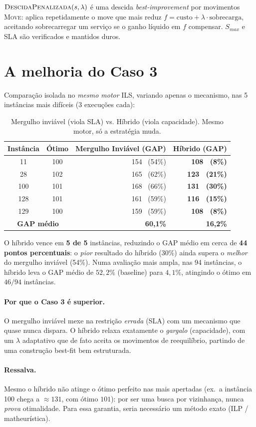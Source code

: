 \documentclass{article}
\begin{document}
\noindent $\textsc{DescidaPenalizada}(s,\lambda)$ é uma descida \emph{best-improvement} por
movimentos \textsc{Move}: aplica repetidamente o move que mais reduz $f = \text{custo} +
\lambda\cdot\text{sobrecarga}$, aceitando sobrecarregar um serviço se o ganho líquido em $f$
compensar. $S_{max}$ e SLA são verificados e mantidos duros.

\section{A melhoria do Caso 3}

Comparação isolada no \emph{mesmo motor} ILS, variando apenas o mecanismo, nas 5 instâncias mais
difíceis (3 execuções cada):

\begin{table}[H]
\centering
\begin{tabular}{ccrr}
\toprule
Instância & Ótimo & Mergulho Inviável (GAP) & Híbrido (GAP) \\
\midrule
11  & 100 & 154 \ (54\%) & \textbf{108 \ (8\%)} \\
28  & 102 & 165 \ (62\%) & \textbf{123 \ (21\%)} \\
100 & 101 & 168 \ (66\%) & \textbf{131 \ (30\%)} \\
128 & 101 & 161 \ (59\%) & \textbf{116 \ (15\%)} \\
129 & 100 & 159 \ (59\%) & \textbf{108 \ (8\%)} \\
\midrule
\multicolumn{2}{c}{\textbf{GAP médio}} & \textbf{60,1\%} & \textbf{16,2\%} \\
\bottomrule
\end{tabular}
\caption{Mergulho inviável (viola SLA) vs. Híbrido (viola capacidade). Mesmo motor,
só a estratégia muda.}
\end{table}

O híbrido vence em \textbf{5 de 5} instâncias, reduzindo o GAP médio em cerca de \textbf{44 pontos
percentuais}: o \emph{pior} resultado do híbrido (30\%) ainda supera o \emph{melhor} do mergulho
inviável (54\%). Numa avaliação mais ampla, nas 94 instâncias, o híbrido leva o GAP médio de
$52{,}2\%$ (baseline) para $4{,}1\%$, atingindo o ótimo em $46/94$ instâncias.

\paragraph{Por que o Caso 3 é superior.} O mergulho inviável mexe na restrição \emph{errada}
(SLA) com um mecanismo que quase nunca dispara. O híbrido relaxa exatamente o \emph{gargalo}
(capacidade), com um $\lambda$ adaptativo que de fato aceita os movimentos de reequilíbrio,
partindo de uma construção best-fit bem estruturada.

\paragraph{Ressalva.} Mesmo o híbrido não atinge o ótimo perfeito nas mais apertadas (ex.\ a
instância 100 chega a $\approx 131$, com ótimo $101$): por ser uma busca por vizinhança, nunca
\emph{prova} otimalidade. Para essa garantia, seria necessário um método exato (ILP /
matheurística).
\end{document}
